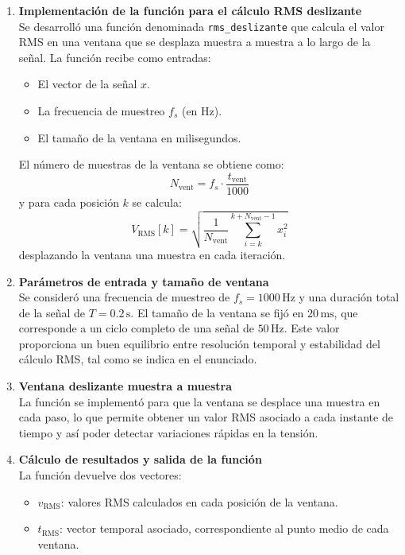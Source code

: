 \documentclass{article}
\begin{document}
\begin{enumerate}
    \item \textbf{Implementación de la función para el cálculo RMS deslizante}\\
    Se desarrolló una función denominada \texttt{rms\_deslizante} que calcula el valor RMS en una ventana que se desplaza muestra a muestra a lo largo de la señal. La función recibe como entradas:
    \begin{itemize}
        \item El vector de la señal $x$.
        \item La frecuencia de muestreo $f_s$ (en Hz).
        \item El tamaño de la ventana en milisegundos.
    \end{itemize}
    El número de muestras de la ventana se obtiene como:
    \[
        N_{\text{vent}} = f_s \cdot \frac{t_{\text{vent}}}{1000}
    \]
    y para cada posición $k$ se calcula:
    \[
        V_{\text{RMS}}[k] = \sqrt{\frac{1}{N_{\text{vent}}} \sum_{i=k}^{k+N_{\text{vent}}-1} x_i^2}
    \]
    desplazando la ventana una muestra en cada iteración.

    \item \textbf{Parámetros de entrada y tamaño de ventana}\\
    Se consideró una frecuencia de muestreo de $f_s = 1000\,\text{Hz}$ y una duración total de la señal de $T = 0.2\,\text{s}$.
    El tamaño de la ventana se fijó en $20\,\text{ms}$, que corresponde a un ciclo completo de una señal de $50\,\text{Hz}$. Este valor proporciona un buen equilibrio entre resolución temporal y estabilidad del cálculo RMS, tal como se indica en el enunciado.

    \item \textbf{Ventana deslizante muestra a muestra}\\
    La función se implementó para que la ventana se desplace una muestra en cada paso, lo que permite obtener un valor RMS asociado a cada instante de tiempo y así poder detectar variaciones rápidas en la tensión.

    \item \textbf{Cálculo de resultados y salida de la función}\\
    La función devuelve dos vectores:
    \begin{itemize}
        \item $v_{\text{RMS}}$: valores RMS calculados en cada posición de la ventana.
        \item $t_{\text{RMS}}$: vector temporal asociado, correspondiente al punto medio de cada ventana.
    \end{itemize}


\end{enumerate}
\end{document}
